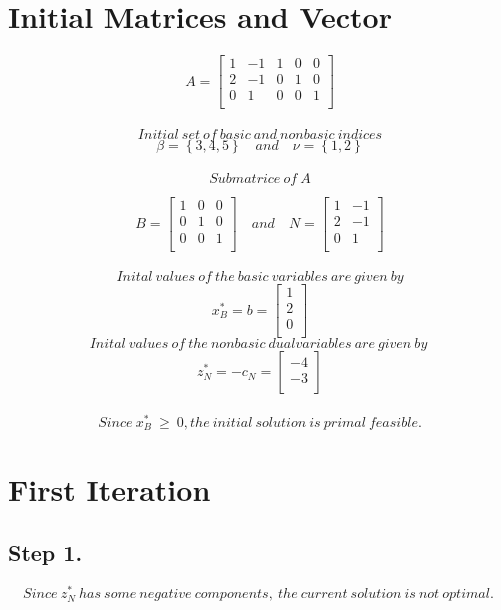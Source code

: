 \documentclass [12pt] {article}
\begin{document}
\section*{Initial Matrices and Vector}
\[
A  =
\begin{bmatrix}
1 & -1 & 1 & 0 & 0 \\
2 & -1  & 0 &1 & 0\\
0 & 1 & 0 & 0 & 1\\
\end{bmatrix}
\]
\\
\[ Initial\ set\  of\  basic\  and\  nonbasic\  indices \]
\[
\beta= \left\{3,4,5\right\} \quad and \quad  \nu=\left\{1,2\right\}
\]
\\
\[
Submatrice\ of \ A
\]

\[
B =
\begin{bmatrix}
1 & 0 & 0 \\
0 &1 & 0\\
0 & 0 & 1\\
\end{bmatrix} \quad and \quad
\mathit{N} =
\begin{bmatrix}
1 & -1 \\
2 &-1\\
0 &1\\
\end{bmatrix}
\]
\\
\[
Inital\ values\ of\ the\ basic\ variables\ are\ given\ by
\]
\[
x_B^* = b =
\begin{bmatrix}
1 \\
2 \\
0\\
\end{bmatrix}
\]
\[
Inital\ values\ of\ the\ nonbasic\ dual variables\ are\ given\ by\
\]
\[
z_\mathit{N}^*= -c_\mathit{N} =
\begin{bmatrix}
-4 \\
-3 \\
\end{bmatrix}
\]
\\
\[
Since\ x_B^*\  \geq \  0, the\ initial\ solution\ is\ primal\ feasible.
\]
\section*{First Iteration}
\subsection{Step 1.}
\[
Since\ z_\mathit{N}^*\ has\ some\ negative\ components,\ the\ current\ solution\ is\ not\ optimal.\
\]
\end{document}
